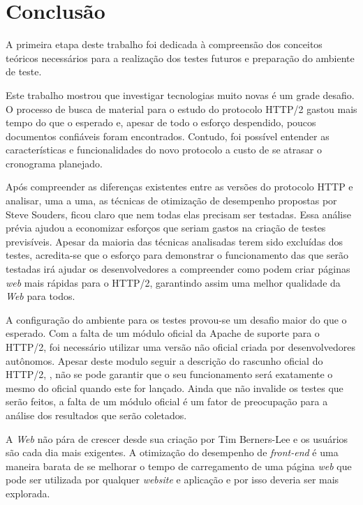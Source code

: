 %
%

\chapter{Conclusão}
\label{chap:conclusao}

A primeira etapa deste trabalho foi dedicada à compreensão dos conceitos teóricos necessários para a realização dos testes futuros e preparação do ambiente de teste.

Este trabalho mostrou que investigar tecnologias muito novas é um grade desafio. O processo de busca de material para o estudo do protocolo HTTP/2 gastou mais tempo do que o esperado e, apesar de todo o esforço despendido, poucos documentos confiáveis foram encontrados. Contudo, foi possível entender as características e funcionalidades do novo protocolo a custo de se atrasar o cronograma planejado.

Após compreender as diferenças existentes entre as versões do protocolo HTTP e analisar, uma a uma, as técnicas de otimização de desempenho propostas por Steve Souders, ficou claro que nem todas elas precisam ser testadas. Essa análise prévia ajudou a economizar esforços que seriam gastos na criação de testes previsíveis. Apesar da maioria das técnicas analisadas terem sido excluídas dos testes, acredita-se que o esforço para demonstrar o funcionamento das que serão testadas irá ajudar os desenvolvedores a compreender como podem criar páginas \textit{web} mais rápidas para o HTTP/2, garantindo assim uma melhor qualidade da \textit{Web} para todos.

A configuração do ambiente para os testes provou-se um desafio maior do que o esperado. Com a falta de um módulo oficial da Apache de suporte para o HTTP/2, foi necessário utilizar uma versão não oficial criada por desenvolvedores autônomos. Apesar deste modulo seguir a descrição do rascunho oficial do HTTP/2, \cite{HTTP2Spec}, não se pode garantir que o seu funcionamento será exatamente o mesmo do oficial quando este for lançado. Ainda que não invalide os testes que serão feitos, a falta de um módulo oficial é um fator de preocupação para a análise dos resultados que serão coletados.

A \textit{Web} não pára de crescer desde sua criação por Tim Berners-Lee e os usuários são cada dia mais exigentes. A otimização do desempenho de \textit{front-end} é uma maneira barata de se melhorar o tempo de carregamento de uma página \textit{web} que pode ser utilizada por qualquer \textit{website} e aplicação e por isso deveria ser mais explorada.

